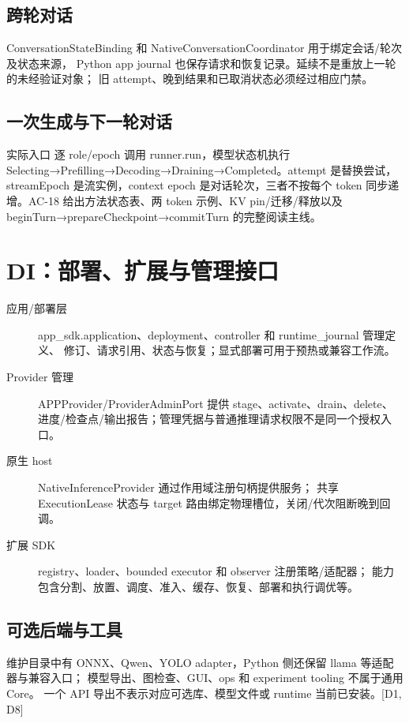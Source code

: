 \subsection{跨轮对话}
ConversationStateBinding 和 NativeConversationCoordinator 用于绑定会话/轮次及状态来源，
Python app journal 也保存请求和恢复记录。延续不是重放上一轮的未经验证对象；
旧 attempt、晚到结果和已取消状态必须经过相应门禁。



\subsection{一次生成与下一轮对话}
实际入口  逐 role/epoch 调用 runner.run，模型状态机执行 Selecting→Prefilling→Decoding→Draining→Completed。attempt 是替换尝试，streamEpoch 是流实例，context epoch 是对话轮次，三者不按每个 token 同步递增。AC-18 给出方法状态表、两 token 示例、KV pin/迁移/释放以及 beginTurn→prepareCheckpoint→commitTurn 的完整阅读主线。

\newpage

\section{DI：部署、扩展与管理接口}
\begin{description}
\item[应用/部署层] app\_sdk.application、deployment、controller 和 runtime\_journal 管理定义、
修订、请求引用、状态与恢复；显式部署可用于预热或兼容工作流。
\item[Provider 管理] APPProvider/ProviderAdminPort 提供 stage、activate、drain、delete、
进度/检查点/输出报告；管理凭据与普通推理请求权限不是同一个授权入口。
\item[原生 host] NativeInferenceProvider 通过作用域注册句柄提供服务；
共享 ExecutionLease 状态与 target 路由绑定物理槽位，关闭/代次阻断晚到回调。
\item[扩展 SDK] registry、loader、bounded executor 和 observer 注册策略/适配器；
能力包含分割、放置、调度、准入、缓存、恢复、部署和执行调优等。
\end{description}

\subsection{可选后端与工具}
维护目录中有 ONNX、Qwen、YOLO adapter，Python 侧还保留 llama 等适配器与兼容入口；
模型导出、图检查、GUI、ops 和 experiment tooling 不属于通用 Core。
一个 API 导出不表示对应可选库、模型文件或 runtime 当前已安装。[D1, D8]

